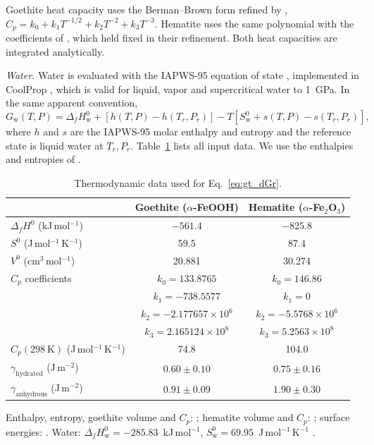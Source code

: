 Goethite heat capacity uses the Berman--Brown form \citep{berman1985} refined by
\citet{majzlan2003}, $C_p = k_0 + k_1 T^{-1/2} + k_2 T^{-2} + k_3 T^{-3}$. Hematite uses the same
polynomial with the coefficients of \citet{berman1988}, which \citet{majzlan2003} held fixed in their
refinement. Both heat capacities are integrated analytically.

\textit{Water.} Water is evaluated with the IAPWS-95 equation of state \citep{wagner2002},
implemented in CoolProp \citep{bell2014}, which is valid for liquid, vapor and supercritical
water to 1~GPa. In the same apparent convention,
\begin{equation}
  G_{\mathrm{w}}(T,P) = \Delta_f H_{\mathrm{w}}^{0} + \left[h(T,P) - h(T_r,P_r)\right]
  - T\left[S_{\mathrm{w}}^{0} + s(T,P) - s(T_r,P_r)\right],
  \label{eq:gt_Gw}
\end{equation}
where $h$ and $s$ are the IAPWS-95 molar enthalpy and entropy and the reference state is liquid
water at $T_r,P_r$. Table~\ref{tab:gt_thermo_data} lists all
input data. We use the enthalpies and entropies of \citet{majzlan2003}.

\begin{table}[htbp]
  \centering
  \caption{Thermodynamic data used for Eq.~\eqref{eq:gt_dGr}.}
  \label{tab:gt_thermo_data}
  \begin{footnotesize}
  \begin{tabular}{lcc}
    \hline
    & Goethite ($\alpha$-FeOOH) & Hematite ($\alpha$-Fe$_2$O$_3$) \\
    \hline
    $\Delta_f H^0$ (kJ\,mol$^{-1}$) & $-561.4$ & $-825.8$ \\
    $S^0$ (J\,mol$^{-1}$\,K$^{-1}$) & 59.5 & 87.4 \\
    $V^0$ (cm$^3$\,mol$^{-1}$) & 20.881 & 30.274 \\
    $C_p$ coefficients & $k_0=133.8765$ & $k_0=146.86$ \\
          & $k_1=-738.5577$ & $k_1=0$ \\
          & $k_2=-2.177657\times10^{6}$ & $k_2=-5.5768\times10^{6}$ \\
          & $k_3=2.165124\times10^{8}$ & $k_3=5.2563\times10^{8}$ \\
    $C_p(298\ \mathrm{K})$ (J\,mol$^{-1}$\,K$^{-1}$) & 74.8 & 104.0 \\
    $\gamma_{\mathrm{hydrated}}$ (J\,m$^{-2}$) & $0.60\pm0.10$ & $0.75\pm0.16$ \\
    $\gamma_{\mathrm{anhydrous}}$ (J\,m$^{-2}$) & $0.91\pm0.09$ & $1.90\pm0.30$ \\
    \hline
  \end{tabular}
  \end{footnotesize}

  \vspace{0.5ex}
  \begin{minipage}{0.85\linewidth}\footnotesize
  Enthalpy, entropy, goethite volume and $C_p$: \citet{majzlan2003}; 
  hematite volume and $C_p$: \citet{berman1988}; surface energies: \citet{navrotsky2008}.
  Water: $\Delta_f H^0_{\mathrm{w}} = -285.83$~kJ\,mol$^{-1}$, $S^0_{\mathrm{w}} = 69.95$~J\,mol$^{-1}$\,K$^{-1}$ \citep{cox1989}.
  \end{minipage}
\end{table}

